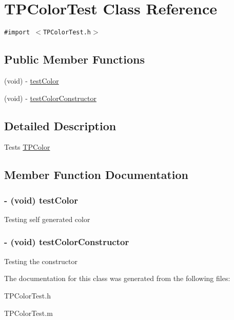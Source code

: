 \hypertarget{interface_t_p_color_test}{
\section{TPColorTest Class Reference}
\label{interface_t_p_color_test}
}
{\tt \#import $<$TPColorTest.h$>$}

\subsection*{Public Member Functions}
\begin{CompactItemize}
\item 
(void) - \hyperlink{interface_t_p_color_test_0024133803ed8df4bce02a227b8cf9a9}{testColor}
\item 
(void) - \hyperlink{interface_t_p_color_test_460dbbfdbfef6457f336d5be1e86fdcd}{testColorConstructor}
\end{CompactItemize}


\subsection{Detailed Description}
Tests \hyperlink{interface_t_p_color}{TPColor} 

\subsection{Member Function Documentation}
\hypertarget{interface_t_p_color_test_0024133803ed8df4bce02a227b8cf9a9}{
\subsubsection[{testColor}]{\setlength{\rightskip}{0pt plus 5cm}- (void) testColor }}
\label{interface_t_p_color_test_0024133803ed8df4bce02a227b8cf9a9}


Testing self generated color \hypertarget{interface_t_p_color_test_460dbbfdbfef6457f336d5be1e86fdcd}{
\subsubsection[{testColorConstructor}]{\setlength{\rightskip}{0pt plus 5cm}- (void) testColorConstructor }}
\label{interface_t_p_color_test_460dbbfdbfef6457f336d5be1e86fdcd}


Testing the constructor 

The documentation for this class was generated from the following files:\begin{CompactItemize}
\item 
TPColorTest.h\item 
TPColorTest.m\end{CompactItemize}
